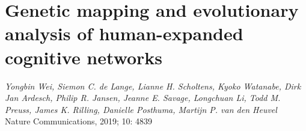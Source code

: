 \pagestyle{MyStyle}

\chapter{Genetic mapping and evolutionary analysis of human-expanded cognitive networks}
\label{ch:HAR}


\begin{flushright}
\textit{Yongbin Wei, Siemon C. de Lange, Lianne H. Scholtens, Kyoko Watanabe, Dirk Jan Ardesch, Philip R. Jansen, Jeanne E. Savage, Longchuan Li, Todd M. Preuss, James K. Rilling, Danielle Posthuma, Martijn P. van den Heuvel}\\
Nature Communications, 2019; 10: 4839
\vspace{7 mm}

\end{flushright}

